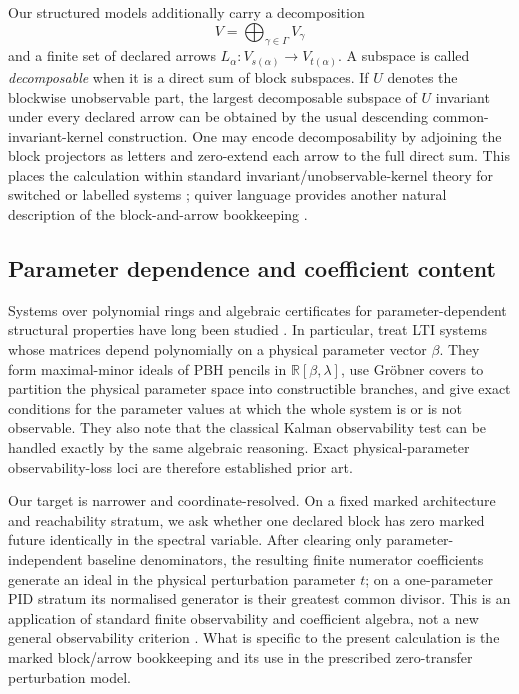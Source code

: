 \documentclass[11pt]{article}
\theoremstyle{definition}
\theoremstyle{remark}
\begin{document}
Our structured models additionally carry a decomposition
\[
V=\bigoplus_{\gamma\in\Gamma}V_\gamma
\]
and a finite set of declared arrows $L_\alpha:V_{s(\alpha)}\to V_{t(\alpha)}$. A subspace is called \emph{decomposable} when it is a direct sum of block subspaces. If $U$ denotes the blockwise unobservable part, the largest decomposable subspace of $U$ invariant under every declared arrow can be obtained by the usual descending common-invariant-kernel construction. One may encode decomposability by adjoining the block projectors as letters and zero-extend each arrow to the full direct sum. This places the calculation within standard invariant/unobservable-kernel theory for switched or labelled systems \parencite{BasileMarro1969,Petreczky2013}; quiver language provides another natural description of the block-and-arrow bookkeeping \parencite{Nijholt2020}.

\subsection{Parameter dependence and coefficient content}

Systems over polynomial rings and algebraic certificates for parameter-dependent structural properties have long been studied \parencite{Habets1992,MeniniIFAC2020,MeniniIET2020}. In particular, \textcite{MeniniIET2020} treat LTI systems whose matrices depend polynomially on a physical parameter vector $\beta$. They form maximal-minor ideals of PBH pencils in $\mathbb{R}[\beta,\lambda]$, use Gr\"obner covers to partition the physical parameter space into constructible branches, and give exact conditions for the parameter values at which the whole system is or is not observable. They also note that the classical Kalman observability test can be handled exactly by the same algebraic reasoning. Exact physical-parameter observability-loss loci are therefore established prior art.

Our target is narrower and coordinate-resolved. On a fixed marked architecture and reachability stratum, we ask whether one declared block has zero marked future identically in the spectral variable. After clearing only parameter-independent baseline denominators, the resulting finite numerator coefficients generate an ideal in the physical perturbation parameter $t$; on a one-parameter PID stratum its normalised generator is their greatest common divisor. This is an application of standard finite observability and coefficient algebra, not a new general observability criterion \parencite{StacksContent}. What is specific to the present calculation is the marked block/arrow bookkeeping and its use in the prescribed zero-transfer perturbation model.
\end{document}
